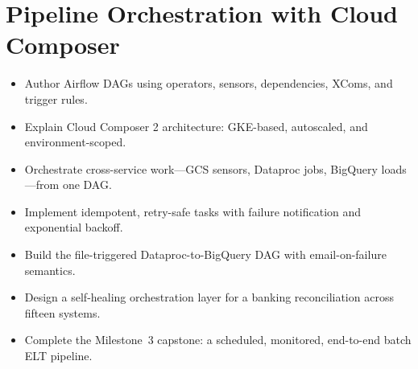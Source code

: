 \chapter{Pipeline Orchestration with Cloud Composer}

\begin{objectives}
\begin{itemize}
    \item Author Airflow DAGs using operators, sensors, dependencies, XComs, and trigger rules.
    \item Explain Cloud Composer 2 architecture: GKE-based, autoscaled, and environment-scoped.
    \item Orchestrate cross-service work---GCS sensors, Dataproc jobs, BigQuery loads---from one DAG.
    \item Implement idempotent, retry-safe tasks with failure notification and exponential backoff.
    \item Build the file-triggered Dataproc-to-BigQuery DAG with email-on-failure semantics.
    \item Design a self-healing orchestration layer for a banking reconciliation across fifteen systems.
    \item Complete the Milestone~3 capstone: a scheduled, monitored, end-to-end batch ELT pipeline.
\end{itemize}
\end{objectives}

